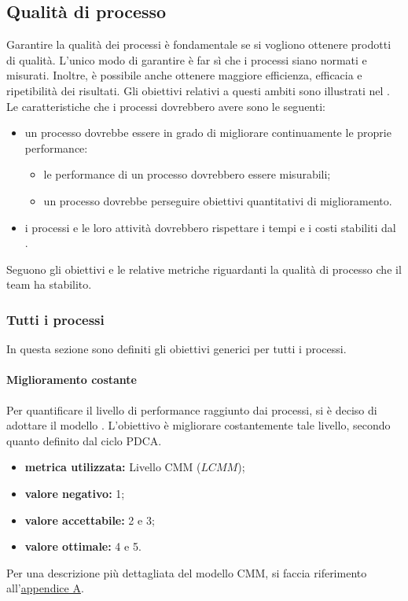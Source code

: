 	\subsection{Qualità di processo}
		Garantire la qualità dei processi è fondamentale se si vogliono ottenere prodotti di qualità. L'unico modo di garantire  è far sì che i processi siano normati e misurati. Inoltre, è possibile anche ottenere maggiore efficienza, efficacia e ripetibilità dei risultati. Gli obiettivi relativi a questi ambiti sono illustrati nel \pdpv.
		Le caratteristiche che i processi dovrebbero avere sono le seguenti:
		\begin{itemize}
			\item un processo dovrebbe essere in grado di migliorare continuamente le proprie performance:
			\begin{itemize}
				\item le performance di un processo dovrebbero essere misurabili;
				\item un processo dovrebbe perseguire obiettivi quantitativi di miglioramento.
			\end{itemize}
			\item i processi e le loro attività dovrebbero rispettare i tempi e i costi stabiliti dal \pdpv.\\
		\end{itemize}
		Seguono gli obiettivi e le relative metriche riguardanti la qualità di processo che il team ha stabilito.
		\subsubsection{Tutti i processi}
			In questa sezione sono definiti gli obiettivi generici per tutti i processi.
			
			\paragraph{Miglioramento costante} 
				\label{OMC}
				Per quantificare il livello di performance raggiunto dai processi, si è deciso di adottare il modello . L'obiettivo è migliorare costantemente tale livello, secondo quanto definito dal ciclo PDCA.
				\begin{itemize}
					\item \textbf{metrica utilizzata:} Livello CMM ($LCMM$);
					\item \textbf{valore negativo:} 1;
					\item \textbf{valore accettabile:} 2 e 3;
					\item \textbf{valore ottimale:} 4 e 5.
				\end{itemize}
				Per una descrizione più dettagliata del modello CMM, si faccia riferimento all'\hyperref[appendice A]{appendice A}. 
					
